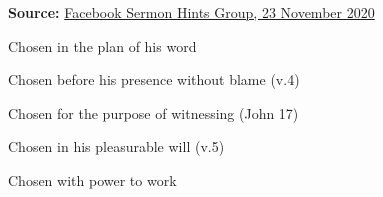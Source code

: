 \noindent \textbf{Source:} \href{https://www.facebook.com/groups/sermonhints/posts/2855730531335409}{Facebook Sermon Hints Group, 23 November 2020}
\begin{compactenum}[I.]
    \item Chosen in the plan of his word
    \item Chosen before his presence without blame (v.4)
    \item Chosen for the purpose of witnessing (John 17)
    \item Chosen in his pleasurable will (v.5)
    \item Chosen with power to work
\end{compactenum}


